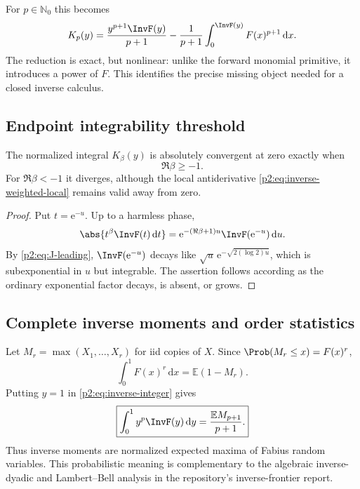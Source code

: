 \documentclass[11pt,oneside]{article}
\theoremstyle{definition}
\theoremstyle{remark}
\newcommand{\E}{\mathbb E}
\newcommand{\N}{\mathbb N}
\newcommand{\dd}{\,\mathrm d}
\newcommand{\e}{\mathrm e}
\newcommand{\1}{\mathbf 1}
\begin{document}
For $p\in\N_0$ this becomes
\begin{equation}
 K_p(y)=\frac{y^{p+1}\InvF(y)}{p+1}
 -\frac1{p+1}\int_0^{\InvF(y)}F(x)^{p+1}\dd x.            \label{p2:eq:inverse-integer}
\end{equation}
The reduction is exact, but nonlinear: unlike the forward monomial primitive,
it introduces a power of $F$.  This identifies the precise missing object
needed for a closed inverse calculus.

\subsection{Endpoint integrability threshold}
\begin{proposition}
\label{p2:prop:inverse-threshold}
The normalized integral $K_\beta(y)$ is absolutely convergent at zero exactly
when
\begin{equation}
 \Re\beta\ge-1.                                            \label{p2:eq:inverse-threshold}
\end{equation}
For $\Re\beta<-1$ it diverges, although the local antiderivative
\eqref{p2:eq:inverse-weighted-local} remains valid away from zero.
\end{proposition}

\begin{proof}
Put $t=\e^{-u}$.  Up to a harmless phase,
\[
 \abs{t^\beta\InvF(t)\dd t}
 =\e^{-(\Re\beta+1)u}\InvF(\e^{-u})\dd u.
\]
By \eqref{p2:eq:J-leading}, $\InvF(\e^{-u})$ decays like
$\sqrt u\,\e^{-\sqrt{2(\log2)u}}$, which is subexponential in $u$ but
integrable.  The assertion follows according as the ordinary exponential
factor decays, is absent, or grows.
\end{proof}

\subsection{Complete inverse moments and order statistics}
Let $M_r=\max(X_1,\ldots,X_r)$ for iid copies of $X$.  Since
$\Prob(M_r\le x)=F(x)^r$,
\begin{equation}
 \int_0^1F(x)^r\dd x=\E(1-M_r).                            \label{p2:eq:max-complement}
\end{equation}
Putting $y=1$ in \eqref{p2:eq:inverse-integer} gives
\begin{equation}
 \boxed{
 \int_0^1y^p\InvF(y)\dd y
 =\frac{\E M_{p+1}}{p+1}.}                                \label{p2:eq:inverse-order-stat}
\end{equation}
Thus inverse moments are normalized expected maxima of Fabius random variables.
This probabilistic meaning is complementary to the algebraic inverse-dyadic
and Lambert--Bell analysis in the repository's inverse-frontier report.
\end{document}
